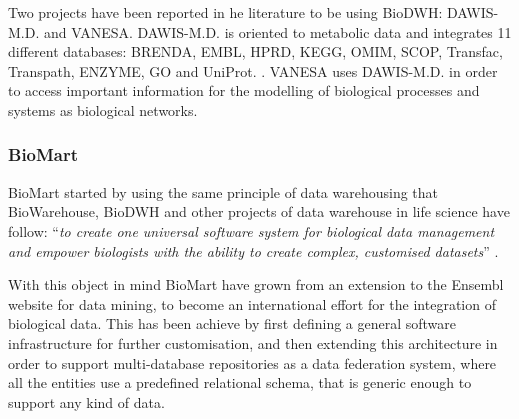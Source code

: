 Two projects have been reported in he literature to be using BioDWH: DAWIS-M.D. and VANESA. DAWIS-M.D. is oriented to metabolic data and integrates 11 different databases: BRENDA, EMBL, HPRD, KEGG, OMIM, SCOP, Transfac, Transpath, ENZYME, GO and UniProt. \cite{HIP2010}. VANESA uses DAWIS-M.D. in order to access important information for the modelling of biological processes and systems as biological networks\cite{BRI2014}.

\subsubsection{BioMart}
BioMart started by using the same principle of data warehousing that BioWarehouse, BioDWH and other projects of data warehouse in life science have follow: ``\emph{to create one universal software system for biological data management and empower biologists with the ability to create complex, customised datasets}'' \cite{KAS2011}.

With this object in mind BioMart have grown from an extension to the Ensembl website for data mining, to become an international effort for the integration of biological data. This has been achieve by first defining a general software infrastructure for further customisation, and then extending this architecture in order to support multi-database repositories as a data federation system, where all the entities use a predefined relational schema, that is generic enough to support any kind of data.

